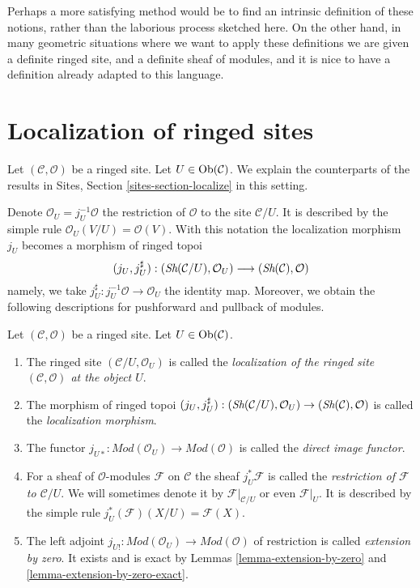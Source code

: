 \medskip\noindent
Perhaps a more satisfying method would be to find an intrinsic definition
of these notions, rather than the laborious process sketched here.
On the other hand, in many geometric situations where we want to apply
these definitions we are given a definite ringed site, and a definite
sheaf of modules, and it is nice to have a definition already adapted to
this language.




\section{Localization of ringed sites}
\label{section-localize}

\noindent
Let $(\mathcal{C}, \mathcal{O})$ be a ringed site.
Let $U \in \mathop{\rm Ob}\nolimits(\mathcal{C})$.
We explain the counterparts of the results in
Sites, Section \ref{sites-section-localize}
in this setting.

\medskip\noindent
Denote
$\mathcal{O}_U = j_U^{-1}\mathcal{O}$ the restriction of $\mathcal{O}$
to the site $\mathcal{C}/U$. It is described by the simple
rule $\mathcal{O}_U(V/U) = \mathcal{O}(V)$. With this notation
the localization morphism $j_U$ becomes a morphism of ringed topoi
$$
(j_U, j_U^\sharp) :
(\mathop{\textit{Sh}}\nolimits(\mathcal{C}/U), \mathcal{O}_U)
\longrightarrow
(\mathop{\textit{Sh}}\nolimits(\mathcal{C}), \mathcal{O})
$$
namely, we take $j_U^\sharp : j_U^{-1}\mathcal{O} \to \mathcal{O}_U$
the identity map.
Moreover, we obtain the following descriptions for pushforward
and pullback of modules.

\begin{definition}
\label{definition-localize-ringed-site}
Let $(\mathcal{C}, \mathcal{O})$ be a ringed site.
Let $U \in \mathop{\rm Ob}\nolimits(\mathcal{C})$.
\begin{enumerate}
\item The ringed site $(\mathcal{C}/U, \mathcal{O}_U)$ is called the
{\it localization of the ringed site $(\mathcal{C}, \mathcal{O})$
at the object $U$}.
\item The morphism of ringed topoi
$(j_U, j_U^\sharp) :
(\mathop{\textit{Sh}}\nolimits(\mathcal{C}/U), \mathcal{O}_U)
\to
(\mathop{\textit{Sh}}\nolimits(\mathcal{C}), \mathcal{O})$
is called the {\it localization morphism}.
\item The functor
$j_{U*} : \textit{Mod}(\mathcal{O}_U) \to \textit{Mod}(\mathcal{O})$
is called the {\it direct image functor}.
\item For a sheaf of $\mathcal{O}$-modules $\mathcal{F}$ on $\mathcal{C}$
the sheaf $j_U^*\mathcal{F}$ is called the
{\it restriction of $\mathcal{F}$ to $\mathcal{C}/U$}.
We will sometimes denote it by
$\mathcal{F}|_{\mathcal{C}/U}$ or even $\mathcal{F}|_U$.
It is described by the simple rule $j_U^*(\mathcal{F})(X/U) = \mathcal{F}(X)$.
\item The left adjoint
$j_{U!} : \textit{Mod}(\mathcal{O}_U) \to \textit{Mod}(\mathcal{O})$
of restriction is called {\it extension by zero}. It exists and is
exact by
Lemmas \ref{lemma-extension-by-zero} and
\ref{lemma-extension-by-zero-exact}.
\end{enumerate}
\end{definition}

